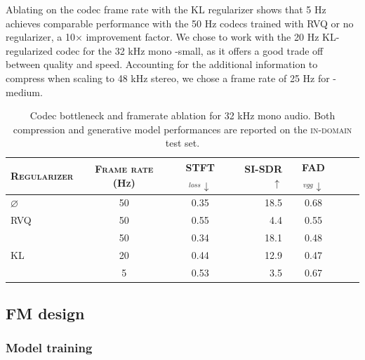 Ablating on the codec frame rate with the KL regularizer shows that 5 Hz achieves comparable performance with the 50 Hz codecs trained with RVQ or no regularizer, a 10$\times$ improvement factor.
We chose to work with the 20 Hz KL-regularized codec for the 32 kHz mono \proposed-small, as it offers a good trade off between quality and speed.
Accounting for the additional information to compress when scaling to 48 kHz stereo, we chose a frame rate of 25 Hz for \proposed-medium.

\begin{table}[t!]
  \centering\small
  \caption{\label{tab:abl_design_codec}Codec bottleneck and framerate ablation for 32 kHz mono audio. Both compression and generative model performances are reported on the \textsc{in-domain} test set.}
  \begin{tabular}{lc|cr|ccc}
    \toprule    
    \textsc{Regularizer} &\textsc{Frame rate (Hz)} &\textsc{STFT}$_{loss} \downarrow$ &\textsc{SI-SDR}$\uparrow$ &FAD$_{vgg} \downarrow$ \\
    \midrule
    \textsc{$\varnothing$} & 50 & 0.35 & 18.5 & 0.68 \\
    \midrule
    \textsc{RVQ} & 50 & 0.55 & 4.4 & 0.55 \\
    \midrule
     & 50 & 0.34 & 18.1 & 0.48 \\
    \textsc{KL} & 20 & 0.44 & 12.9 & 0.47 \\
     & 5 & 0.53 & 3.5 & 0.67 \\
    \bottomrule
  \end{tabular}
\end{table}

\subsection{FM design}

\subsubsection{Model training}
\label{exp:design}

